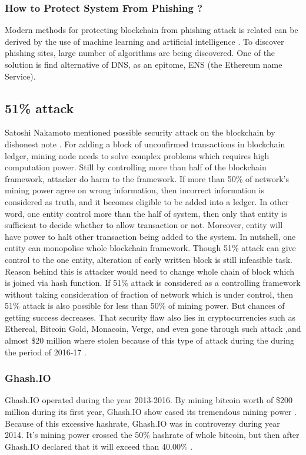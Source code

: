 \documentclass[a4paper,twoside,12pt]{report}
\begin{document}
\begin{spacing}{1.5}
\subsubsection{How to Protect System From Phishing ?}
Modern methods for protecting blockchain from phishing attack is related can be derived by the use of machine learning and artificial intelligence \cite{blockchainthreatreport,andryukhinphishing}. To discover phishing sites, large number of algorithms are being discovered. One of the solution is find alternative of DNS, as an epitome, ENS (the Ethereum name Service). \cite{andryukhin_phishing_2019} 
\subsection{51\% attack}
\label{51attack}
Satoshi Nakamoto mentioned possible security attack on the blockchain by dishonest note \cite{satoshinakamoto}. For adding a block of unconfirmed transactions in blockchain ledger, mining node needs to solve complex problems which requires high computation power. Still by controlling more than half of the blockchain framework, attacker do harm to the framework. If more than 50\% of network's mining power agree on wrong information, then incorrect information is considered as truth, and it becomes eligible to be added into a ledger. In other word, one entity control more than the half of system, then only that entity is sufficient to decide whether to allow transaction or not. Moreover, entity will have power to halt other transaction being added to the system. In nutshell, one entity can monopolise whole blockchain framework. Though 51\% attack can give control to the one entity, alteration of early written block is still infeasible task. Reason behind this is attacker would need to change whole chain of block which is joined via hash function. If 51\% attack is considered as a controlling framework without taking consideration of fraction of network which is under control, then 51\% attack is also possible for less than 50\% of mining power. But chances of getting success decreases. That security flaw also lies in cryptocurrencies such as Ethereal, Bitcoin Gold, Monacoin, Verge, and even gone through such attack ,and almost \$20 million where stolen because of this type of attack during the during the period of 2016-17 \cite{topfiveblockchainsecurityissues,51attackonline}.

\subsubsection{Ghash.IO}
Ghash.IO operated during the year 2013-2016. By mining bitcoin worth of \$200 million during its first year, Ghash.IO show cased its tremendous mining power \cite{wiki:ghash.IO}. Because of this excessive hashrate, Ghash.IO was in controversy during year 2014. It's mining power crossed the 50\% hashrate of whole bitcoin, but then after Ghash.IO declared that it will exceed than 40.00\% \cite{wiki:ghash.IO}. 

\end{spacing}
\end{document}
